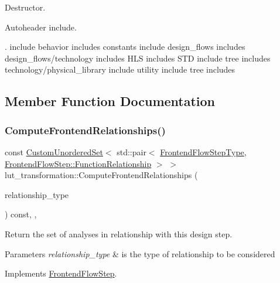 Destructor. 

Autoheader include.

. include behavior includes constants include design\+\_\+flows includes design\+\_\+flows/technology includes H\+LS includes S\+TD include tree includes technology/physical\+\_\+library include utility include tree includes 

\subsection{Member Function Documentation}
\mbox{\label{classlut__transformation_af8ac14b6eaae00e154894fea4626252b}} 
\subsubsection{\texorpdfstring{Compute\+Frontend\+Relationships()}{ComputeFrontendRelationships()}}
{\footnotesize\ttfamily const \hyperlink{classCustomUnorderedSet}{Custom\+Unordered\+Set}$<$ std\+::pair$<$ \hyperlink{frontend__flow__step_8hpp_afeb3716c693d2b2e4ed3e6d04c3b63bb}{Frontend\+Flow\+Step\+Type}, \hyperlink{classFrontendFlowStep_af7cf30f2023e5b99e637dc2058289ab0}{Frontend\+Flow\+Step\+::\+Function\+Relationship} $>$ $>$ lut\+\_\+transformation\+::\+Compute\+Frontend\+Relationships (\begin{DoxyParamCaption}\item[{const \hyperlink{classDesignFlowStep_a723a3baf19ff2ceb77bc13e099d0b1b7}{Design\+Flow\+Step\+::\+Relationship\+Type}}]{relationship\+\_\+type }\end{DoxyParamCaption}) const\hspace{0.3cm}{\ttfamily [override]}, {\ttfamily [private]}, {\ttfamily [virtual]}}



Return the set of analyses in relationship with this design step. 


\begin{DoxyParams}{Parameters}
{\em relationship\+\_\+type} & is the type of relationship to be considered \\
\hline
\end{DoxyParams}


Implements \hyperlink{classFrontendFlowStep_abeaff70b59734e462d347ed343dd700d}{Frontend\+Flow\+Step}.




